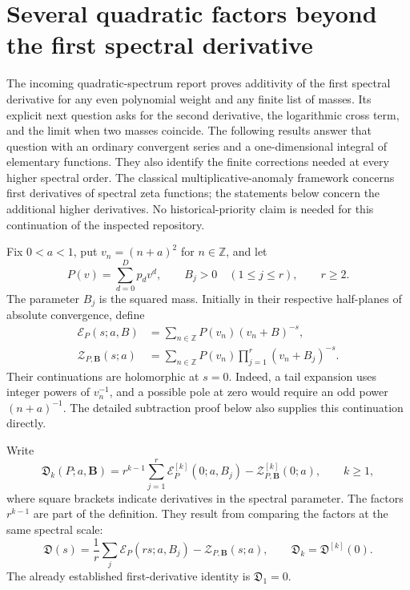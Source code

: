 \section{Several quadratic factors beyond the first spectral derivative}
\label{msj:sec:main}

The incoming quadratic-spectrum report \cite{Quadratic} proves additivity of the first
spectral derivative for any even polynomial weight and any finite list
of masses. Its explicit next question asks for the second derivative,
the logarithmic cross term, and the limit when two masses coincide.
The following results answer that question with an ordinary convergent
series and a one-dimensional integral of elementary functions. They also
identify the finite corrections needed at every higher spectral order.
The classical multiplicative-anomaly framework \cite{EVZ} concerns first derivatives
of spectral zeta functions; the statements below concern the additional
higher derivatives. No historical-priority claim is needed for this
continuation of the inspected repository.

Fix $0<a<1$, put $v_n=(n+a)^2$ for $n\in\mathbb Z$, and let
\[
 P(v)=\sum_{d=0}^{D}p_dv^d,\qquad B_j>0\quad(1\le j\le r),\qquad r\ge2.
\]
The parameter $B_j$ is the squared mass. Initially in their respective
half-planes of absolute convergence, define
\begin{align}
 \mathcal E_P(s;a,B)&=\sum_{n\in\mathbb Z}P(v_n)(v_n+B)^{-s},
 \label{msj:eq:E}\\
 \mathcal Z_{P,\boldsymbol B}(s;a)
 &=\sum_{n\in\mathbb Z}P(v_n)
                  \prod_{j=1}^{r}(v_n+B_j)^{-s}.
 \label{msj:eq:Z}
\end{align}
Their continuations are holomorphic at $s=0$. Indeed, a tail expansion
uses integer powers of $v_n^{-1}$, and a possible pole at zero would
require an odd power $(n+a)^{-1}$. The detailed subtraction proof below
also supplies this continuation directly.

Write
\begin{equation}
 \mathfrak D_k(P;a,\boldsymbol B)
 =r^{k-1}\sum_{j=1}^{r}\mathcal E_P^{[k]}(0;a,B_j)
       -\mathcal Z_{P,\boldsymbol B}^{[k]}(0;a),
 \qquad k\ge1,
 \label{msj:eq:defect}
\end{equation}
where square brackets indicate derivatives in the spectral parameter.
The factors $r^{k-1}$ are part of the definition. They result from
comparing the factors at the same spectral scale:
\begin{equation}
 \mathfrak D(s)=\frac1r\sum_j\mathcal E_P(rs;a,B_j)
                           -\mathcal Z_{P,\boldsymbol B}(s;a),
 \qquad \mathfrak D_k=\mathfrak D^{[k]}(0).
 \label{msj:eq:common-scale}
\end{equation}
The already established first-derivative identity is $\mathfrak D_1=0$.

